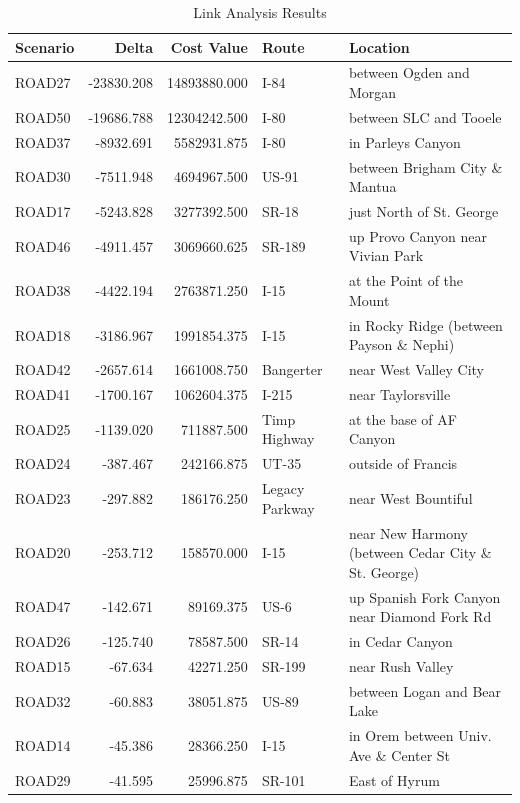 \begin{table}

\caption{\label{tab:linkresults}Link Analysis Results}
\centering
\begin{tabular}[t]{lrrll}
\toprule
Scenario & Delta & Cost Value & Route & Location\\
\midrule
ROAD27 & -23830.208 & 14893880.000 & I-84 & between Ogden and Morgan\\
ROAD50 & -19686.788 & 12304242.500 & I-80 & between SLC and Tooele\\
ROAD37 & -8932.691 & 5582931.875 & I-80 & in Parleys Canyon\\
ROAD30 & -7511.948 & 4694967.500 & US-91 & between Brigham City \& Mantua\\
ROAD17 & -5243.828 & 3277392.500 & SR-18 & just North of St. George\\
\addlinespace
ROAD46 & -4911.457 & 3069660.625 & SR-189 & up Provo Canyon near Vivian Park\\
ROAD38 & -4422.194 & 2763871.250 & I-15 & at the Point of the Mount\\
ROAD18 & -3186.967 & 1991854.375 & I-15 & in Rocky Ridge (between Payson \& Nephi)\\
ROAD42 & -2657.614 & 1661008.750 & Bangerter & near West Valley City\\
ROAD41 & -1700.167 & 1062604.375 & I-215 & near Taylorsville\\
\addlinespace
ROAD25 & -1139.020 & 711887.500 & Timp Highway & at the base of AF Canyon\\
ROAD24 & -387.467 & 242166.875 & UT-35 & outside of Francis\\
ROAD23 & -297.882 & 186176.250 & Legacy Parkway & near West Bountiful\\
ROAD20 & -253.712 & 158570.000 & I-15 & near New Harmony (between Cedar City \& St. George)\\
ROAD47 & -142.671 & 89169.375 & US-6 & up Spanish Fork Canyon near Diamond Fork Rd\\
\addlinespace
ROAD26 & -125.740 & 78587.500 & SR-14 & in Cedar Canyon\\
ROAD15 & -67.634 & 42271.250 & SR-199 & near Rush Valley\\
ROAD32 & -60.883 & 38051.875 & US-89 & between Logan and Bear Lake\\
ROAD14 & -45.386 & 28366.250 & I-15 & in Orem between Univ. Ave \& Center St\\
ROAD29 & -41.595 & 25996.875 & SR-101 & East of Hyrum\\

\end{tabular}
\end{table}
